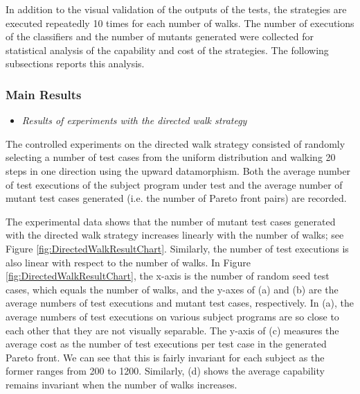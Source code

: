 \documentclass[preprint,1p,authoryear,times]{elsarticle}
\begin{document}
In addition to the visual validation of the outputs of the tests, the strategies are executed repeatedly 10 times for each number of walks. The number of executions of the classifiers and the number of mutants generated were collected for statistical analysis of the capability and cost of the strategies. The following subsections reports this analysis. 

\subsubsection{Main Results}

\begin{itemize}
\item \emph{Results of experiments with the directed walk strategy}
\end{itemize}

The controlled experiments on the directed walk strategy consisted of randomly selecting a number of test cases from the uniform distribution and walking 20 steps in one direction using the upward datamorphism. Both the average number of test executions of the subject program under test and the average number of mutant test cases generated (i.e. the number of Pareto front pairs) are recorded.

The experimental data shows that the number of mutant test cases generated with the directed walk strategy increases linearly with the number of walks; see Figure \ref{fig:DirectedWalkResultChart}. Similarly, the number of test executions is also linear with respect to the number of walks. In Figure \ref{fig:DirectedWalkResultChart}, the x-axis is the number of random seed test cases, which equals the number of walks, and the y-axes of (a) and (b) are the average numbers of test executions and mutant test cases, respectively. In (a), the average numbers of test executions on various subject programs are so close to each other that they are not visually separable. The y-axis of (c) measures the average cost as the number of test executions per test case in the generated Pareto front. We can see that this is fairly invariant for each subject as the former ranges from 200 to 1200. Similarly, (d) shows the average capability remains invariant when the number of walks increases. 
\end{document}

